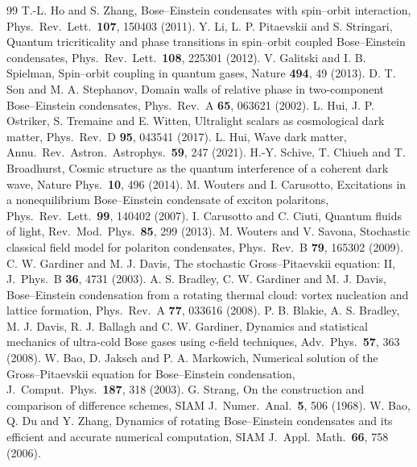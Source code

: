 \documentclass[11pt,a4paper]{article}
\begin{document}
\begin{thebibliography}{99}
 T.-L. Ho and S. Zhang, Bose--Einstein condensates with spin--orbit interaction, Phys.\ Rev.\ Lett.\ \textbf{107}, 150403 (2011).
 Y. Li, L. P. Pitaevskii and S. Stringari, Quantum tricriticality and phase transitions in spin--orbit coupled Bose--Einstein condensates, Phys.\ Rev.\ Lett.\ \textbf{108}, 225301 (2012).
 V. Galitski and I. B. Spielman, Spin--orbit coupling in quantum gases, Nature \textbf{494}, 49 (2013).
 D. T. Son and M. A. Stephanov, Domain walls of relative phase in two-component Bose--Einstein condensates, Phys.\ Rev.\ A \textbf{65}, 063621 (2002).
 L. Hui, J. P. Ostriker, S. Tremaine and E. Witten, Ultralight scalars as cosmological dark matter, Phys.\ Rev.\ D \textbf{95}, 043541 (2017).
 L. Hui, Wave dark matter, Annu.\ Rev.\ Astron.\ Astrophys.\ \textbf{59}, 247 (2021).
 H.-Y. Schive, T. Chiueh and T. Broadhurst, Cosmic structure as the quantum interference of a coherent dark wave, Nature Phys.\ \textbf{10}, 496 (2014).
 M. Wouters and I. Carusotto, Excitations in a nonequilibrium Bose--Einstein condensate of exciton polaritons, Phys.\ Rev.\ Lett.\ \textbf{99}, 140402 (2007).
 I. Carusotto and C. Ciuti, Quantum fluids of light, Rev.\ Mod.\ Phys.\ \textbf{85}, 299 (2013).
 M. Wouters and V. Savona, Stochastic classical field model for polariton condensates, Phys.\ Rev.\ B \textbf{79}, 165302 (2009).
 C. W. Gardiner and M. J. Davis, The stochastic Gross--Pitaevskii equation: II, J.\ Phys.\ B \textbf{36}, 4731 (2003).
 A. S. Bradley, C. W. Gardiner and M. J. Davis, Bose--Einstein condensation from a rotating thermal cloud: vortex nucleation and lattice formation, Phys.\ Rev.\ A \textbf{77}, 033616 (2008).
 P. B. Blakie, A. S. Bradley, M. J. Davis, R. J. Ballagh and C. W. Gardiner, Dynamics and statistical mechanics of ultra-cold Bose gases using c-field techniques, Adv.\ Phys.\ \textbf{57}, 363 (2008).
 W. Bao, D. Jaksch and P. A. Markowich, Numerical solution of the Gross--Pitaevskii equation for Bose--Einstein condensation, J.\ Comput.\ Phys.\ \textbf{187}, 318 (2003).
 G. Strang, On the construction and comparison of difference schemes, SIAM J.\ Numer.\ Anal.\ \textbf{5}, 506 (1968).
 W. Bao, Q. Du and Y. Zhang, Dynamics of rotating Bose--Einstein condensates and its efficient and accurate numerical computation, SIAM J.\ Appl.\ Math.\ \textbf{66}, 758 (2006).

\end{thebibliography}
\end{document}
